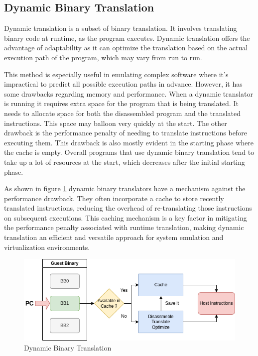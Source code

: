 \subsection{Dynamic Binary Translation}
Dynamic translation is a subset of binary translation.
It involves translating binary code at runtime, as the program executes.
Dynamic translation offers the advantage of adaptability as it can optimize the translation based on the actual execution path of the program, which may vary from run to run.

This method is especially useful in emulating complex software where it's impractical to predict all possible execution paths in advance.
However, it has some drawbacks regarding memory and performance.
When a dynamic translator is running it requires extra space for the program that is being translated.
It needs to allocate space for both the disassembled program and the translated instructions.
This space may balloon very quickly at the start.
The other drawback is the performance penalty of needing to translate instructions before executing them.
This drawback is also mostly evident in the starting phase where the cache is empty.
Overall programs that use dynamic binary translation tend to take up a lot of resources at the start, which decreases after the initial starting phase.

As shown in figure \ref{fig:dynamic_binary_translation} dynamic binary translators have a mechanism against the performance drawback.
They often incorporate a cache to store recently translated instructions, reducing the overhead of re-translating those instructions on subsequent executions. 
This caching mechanism is a key factor in mitigating the performance penalty associated with runtime translation, making dynamic translation an efficient and versatile approach for system emulation and virtualization environments.


\begin{figure}[ht]
    \centering
    \includegraphics[width=0.8\linewidth]{figures/dyn_bin_trans}
    \caption{Dynamic Binary Translation}
    \label{fig:dynamic_binary_translation}
\end{figure}

